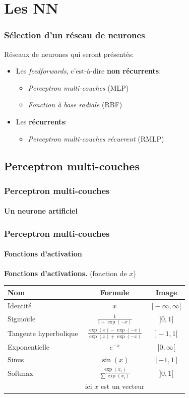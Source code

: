 \section{Les NN}

\begin{frame}
 \frametitle{Sélection d'un réseau de neurones}
 Réseaux de neurones qui seront présentés:\\
 \begin{itemize}
  \item Les \emph{feedforwards}, c'est-à-dire \textbf{non récurrents}:\\
   \begin{itemize}
    \item \alert{\emph{Perceptron multi-couches}} (MLP)
    \item \alert{\emph{Fonction à base radiale}} (RBF) %
   \end{itemize}
  \item Les \textbf{récurrents}:\\
   \begin{itemize}
    \item \alert{\emph{Perceptron multi-couches récurrent}} (RMLP)
   \end{itemize}
 \end{itemize}
\end{frame}

\subsection{Perceptron multi-couches}
\begin{frame}
 \frametitle{Perceptron multi-couches}
 \framesubtitle{Un neurone artificiel}
\end{frame}

\begin{frame}
 \frametitle{Perceptron multi-couches}
 \framesubtitle{Fonctions d'activation}
 \begin{table}
 \centering
 \textbf{Fonctions d'activations.} (fonction de $x$)\\
 \begin{tabular}{|l|c|c|}
  \hline
  Nom & Formule & Image\\
  \hline
  Identité & $x$ & $]-\infty,\infty[$\\
  \hline
  Sigmoïde & $\frac{1}{1+\exp{(-x)}}$ & $]0,1]$\\
  \hline
  Tangente hyperbolique & $\frac{\exp{(x)}-\exp{(-x)}}{\exp{(x)}+\exp{(-x)}}$ & $]-1,1[$\\
  \hline
  Exponentielle & $e^{-x}$ & $]0,\infty[$\\
  \hline
  Sinus & $\sin{(x)}$ & $[-1,1]$\\
  \hline
  Softmax & $\frac{\exp{(x_i)}}{\sum{\exp{(x_i)}}}$ & $]0,1[$\\
   & \small ici $x$ est un vecteur & \\
  \hline
 \end{tabular}
\end{table}
\end{frame}

